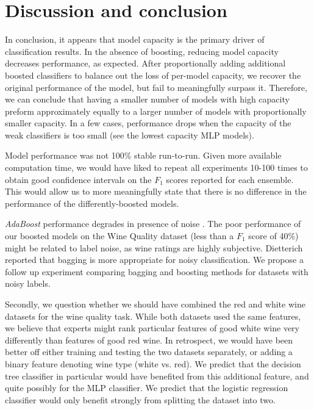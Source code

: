 \documentclass{article}
\begin{document}
\section{Discussion and conclusion}

In conclusion, it appears that model capacity is the primary driver of classification results. In the absence of boosting, reducing model capacity decreases performance, as expected. After proportionally adding additional boosted classifiers to balance out the loss of per-model capacity, we recover the original performance of the model, but fail to meaningfully surpass it. Therefore, we can conclude that having a smaller number of models with high capacity preform approximately equally to a larger number of models with proportionally smaller capacity. In a few cases, performance drops when the capacity of the weak classifiers is too small (see the lowest capacity MLP models).

Model performance was not 100\% stable run-to-run. Given more available computation time, we would have liked to repeat all experiments 10-100 times to obtain good confidence intervals on the $F_1$ scores reported for each ensemble. This would allow us to more meaningfully state that there is no difference in the performance of the differently-boosted models.

\textit{AdaBoost} performance degrades in presence of noise \cite{Diet}. The poor performance of our boosted models on the Wine Quality dataset (less than a $F_1$ score of 40\%) might be related to label noise, as wine ratings are highly subjective. Dietterich \cite{Diet} reported that bagging is more appropriate for noisy classification. We propose a follow up experiment comparing bagging and boosting methods for datasets with noisy labels.

Secondly, we question whether we should have combined the red and white wine datasets for the wine quality task. While both datasets used the same features, we believe that experts might rank particular features of good white wine very differently than features of good red wine. In retrospect, we would have been better off either training and testing the two datasets separately, or adding a binary feature denoting wine type (white vs. red). We predict that the decision tree classifier in particular would have benefited from this additional feature, and quite possibly for the MLP classifier. We predict that the logistic regression classifier would only benefit strongly from splitting the dataset into two.
\end{document}
